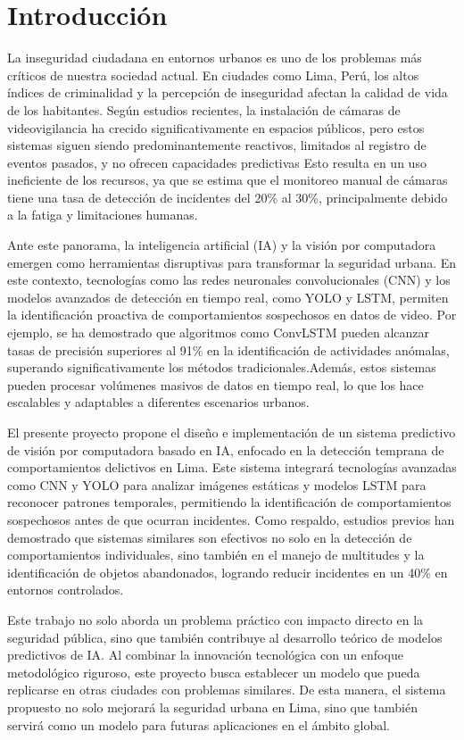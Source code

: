 
\chapter*{Introducción}
La inseguridad ciudadana en entornos urbanos es uno de los problemas más críticos de nuestra sociedad actual. En ciudades como Lima, Perú, los altos índices de criminalidad y la percepción de inseguridad afectan la calidad de vida de los habitantes. Según estudios recientes, la instalación de cámaras de videovigilancia ha crecido significativamente en espacios públicos, pero estos sistemas siguen siendo predominantemente reactivos, limitados al registro de eventos pasados, y no ofrecen capacidades predictivas Esto resulta en un uso ineficiente de los recursos, ya que se estima que el monitoreo manual de cámaras tiene una tasa de detección de incidentes del 20\% al 30\%, principalmente debido a la fatiga y limitaciones humanas.

Ante este panorama, la inteligencia artificial (IA) y la visión por computadora emergen como herramientas disruptivas para transformar la seguridad urbana. En este contexto, tecnologías como las redes neuronales convolucionales (CNN) y los modelos avanzados de detección en tiempo real, como YOLO y LSTM, permiten la identificación proactiva de comportamientos sospechosos en datos de video. Por ejemplo, se ha demostrado que algoritmos como ConvLSTM pueden alcanzar tasas de precisión superiores al 91\% en la identificación de actividades anómalas, superando significativamente los métodos tradicionales.Además, estos sistemas pueden procesar volúmenes masivos de datos en tiempo real, lo que los hace escalables y adaptables a diferentes escenarios urbanos.

El presente proyecto propone el diseño e implementación de un sistema predictivo de visión por computadora basado en IA, enfocado en la detección temprana de comportamientos delictivos en Lima. Este sistema integrará tecnologías avanzadas como CNN y YOLO para analizar imágenes estáticas y modelos LSTM para reconocer patrones temporales, permitiendo la identificación de comportamientos sospechosos antes de que ocurran incidentes. Como respaldo, estudios previos han demostrado que sistemas similares son efectivos no solo en la detección de comportamientos individuales, sino también en el manejo de multitudes y la identificación de objetos abandonados, logrando reducir incidentes en un 40\% en entornos controlados.

Este trabajo no solo aborda un problema práctico con impacto directo en la seguridad pública, sino que también contribuye al desarrollo teórico de modelos predictivos de IA. Al combinar la innovación tecnológica con un enfoque metodológico riguroso, este proyecto busca establecer un modelo que pueda replicarse en otras ciudades con problemas similares. De esta manera, el sistema propuesto no solo mejorará la seguridad urbana en Lima, sino que también servirá como un modelo para futuras aplicaciones en el ámbito global.
